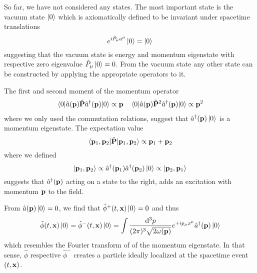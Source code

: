 So far, we have not considered any states.
The most important state is the vacuum state $\ket{0}$ which is axiomatically defined to be invariant under spacetime translations~\cite[p.~276]{Bogolubov1989}
\begin{equation}
	e^{i\hat{P}_\mu a^\mu}
	\ket{0}
	=
	\ket{0}
\end{equation}
suggesting that the vacuum state is energy and momentum eigenstate with respective zero eigenvalue $\hat{P}_\mu\ket{0}=0$.
From the vacuum state any other state can be constructed by applying the appropriate operators to it.

The first and second moment of the momentum operator
\begin{align}
	\expval{\hat{a}(\vb{p})\hat{\vb{P}}\hat{a}^\dagger(\vb{p})}{0}
	\propto
	\vb{p}
	&&
	\expval{\hat{a}(\vb{p})\hat{\vb{P}}^2\hat{a}^\dagger(\vb{p})}{0}
	\propto
	\vb{p}^2
\end{align}
where we only used the commutation relations, suggest that $\hat{a}^\dagger(\vb{p})\ket{0}$ is a momentum eigenstate.
The expectation value
\begin{equation}
	\expval{\hat{\vb{P}}}{\vb{p}_1,\vb{p}_2}
	\propto
	\vb{p}_1+\vb{p}_2
\end{equation}
where we defined
\begin{equation}
	\ket{\vb{p}_1,\vb{p}_2}
	\propto
	\hat{a}^\dagger(\vb{p}_1)
	\hat{a}^\dagger(\vb{p}_2)
	\ket{0}
	\propto
	\ket{\vb{p}_2,\vb{p}_1}
\end{equation}
suggests that $\hat{a}^\dagger(\vb{p})$ acting on a state to the right, adds an excitation with momentum $\vb{p}$ to the field.

From $\hat{a}(\vb{p})\ket{0}=0$, we find that $\hat\phi^+(t,\vb{x})\ket{0}=0$ and thus
\begin{equation}
	\hat\phi(t,\vb{x})
	\ket{0}
	=
	\hat\phi^-(t,\vb{x})
	\ket{0}
	=
	\int\frac{\dd[3]{p}}{(2\pi)^3\sqrt{2\omega(\vb{p})}}
	e^{+ip_\mu x^\mu}
	\hat{a}^\dagger(\vb{p})
	\ket{0}
\end{equation}
which resembles the Fourier transform of of the momentum eigenstate.
In that sense, $\hat\phi$ respective $\hat\phi^-$ creates a particle ideally localized at the spacetime event $(t,\vb{x})$.

